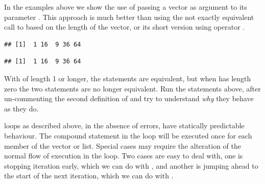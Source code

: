 \documentclass[krantz2]{krantz}\usepackage{knitr}%
\begin{document}
\begin{advplayground}
In the examples above we show the use of  passing a vector as argument to its parameter . This approach is much better than using the not exactly equivalent call to  based on the length of the vector, or its short version using operator \code{:}.

\begin{knitrout}\footnotesize
{}\color{fgcolor}\begin{kframe}
\begin{alltt}
 \hlkwb{<-} \hlstd{(}\hlstd{,} \hlstd{,} \hlstd{,} \hlstd{,} \hlstd{)}

 \hlkwb{<-} \hlstd{(}
  \hlstd{(} 
   \hlkwb{<-} \hlopt{^}
\hlstd{\}}
\end{alltt}
\begin{verbatim}
## [1]  1 16  9 36 64
\end{verbatim}
\begin{alltt}
 \hlkwb{<-} \hlstd{(}
  \hlopt{:}
   \hlkwb{<-} \hlopt{^}
\hlstd{\}}
\end{alltt}
\begin{verbatim}
## [1]  1 16  9 36 64
\end{verbatim}
\end{kframe}
\end{knitrout}

With  of length 1 or longer, the statements are equivalent, but when  has length zero the two statements are no longer equivalent. Run the statements above, after un-commenting the second definition of  and try to understand \emph{why} they behave as they do.
\end{advplayground}

\begin{explainbox}
 loops as described above, in the absence of errors, have statically predictable behaviour. The compound statement in the loop will be executed once for each member of the vector or list. Special cases may require the alteration of the normal flow of execution in the loop. Two cases are easy to deal with, one is stopping iteration early, which we can do with , and another is jumping ahead to the start of the next iteration, which we can do with .
\end{explainbox}
\end{document}
